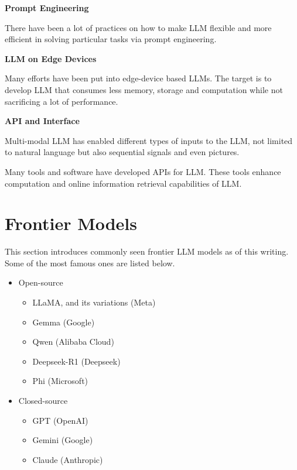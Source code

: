 \vspace{0.1in}
\noindent \textbf{Prompt Engineering}
\vspace{0.1in}

There have been a lot of practices on how to make LLM flexible and more efficient in solving particular tasks via prompt engineering.

\vspace{0.1in}
\noindent \textbf{LLM on Edge Devices}
\vspace{0.1in}

Many efforts have been put into edge-device based LLMs. The target is to develop LLM that consumes less memory, storage and computation while not sacrificing a lot of performance.

\vspace{0.1in}
\noindent \textbf{API and Interface}
\vspace{0.1in}

Multi-modal LLM has enabled different types of inputs to the LLM, not limited to natural language but also sequential signals and even pictures.

Many tools and software have developed APIs for LLM. These tools enhance computation and online information retrieval capabilities of LLM.

\section{Frontier Models}

This section introduces commonly seen frontier LLM models as of this writing. Some of the most famous ones are listed below.

\begin{itemize}
  \item Open-source
  \begin{itemize}
    \item LLaMA, and its variations (Meta)
    \item Gemma (Google)
    \item Qwen (Alibaba Cloud)
    \item Deepseek-R1 (Deepseek)
    \item Phi (Microsoft)
  \end{itemize}
  \item Closed-source
  \begin{itemize}
    \item GPT (OpenAI)
    \item Gemini (Google)
    \item Claude (Anthropic)
  \end{itemize}
\end{itemize}


